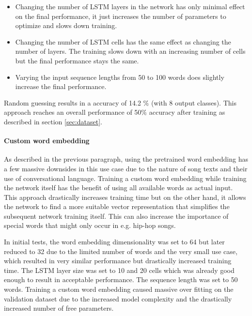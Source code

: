 \documentclass[12pt]{article}
\begin{document}
\begin{itemize}
	\item Changing the number of LSTM layers in the network has only minimal effect on the final performance, it just increases the number of parameters to optimize and slows down training.
	\item Changing the number of LSTM cells has the same effect as changing the number of layers. The training slows down with an increasing number of cells but the final performance stays the same.
	\item Varying the input sequence lengths from 50 to 100 words does slightly increase the final performance.
\end{itemize}

Random guessing results in a accuracy of 14.2 \% (with 8 output classes). This approach reaches an overall performance of 50\% accuracy after training as described in section \ref{sec:dataset}.

\paragraph*{Custom word embedding}
As described in the previous paragraph, using the pretrained word embedding has a few massive downsides in this use case due to the nature of song texts and their use of conversational language. Training a custom word embedding while training the network itself has the benefit of using all available words as actual input. This approach drastically increases training time but on the other hand, it allows the network to find a more suitable vector representation that simplifies the subsequent network training itself. This can also increase the importance of special words that might only occur in e.g. hip-hop songs.

In initial tests, the word embedding dimensionality was set to 64 but later reduced to 32 due to the limited number of words and the very small use case, which resulted in very similar performance but drastically increased training time. The LSTM layer size was set to 10 and 20 cells which was already good enough to result in acceptable performance. The sequence length was set to 50 words. Training a custom word embedding caused massive over fitting on the validation dataset due to the increased model complexity and the drastically increased number of free parameters.
\end{document}
